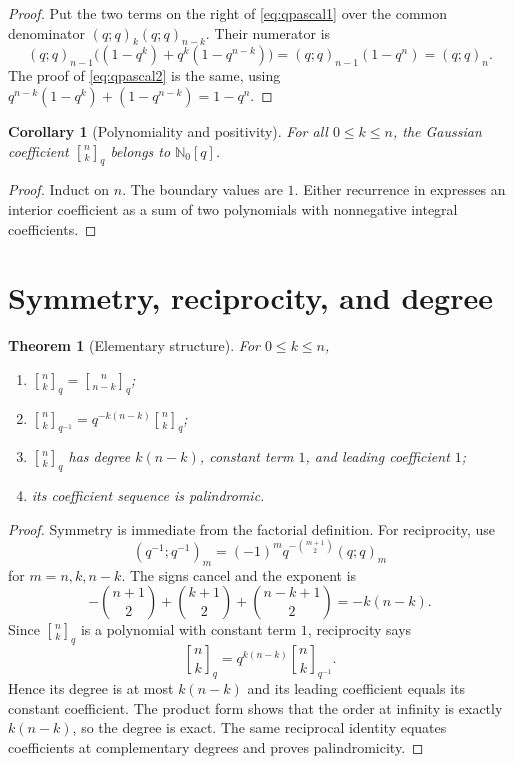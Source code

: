 \documentclass[11pt,oneside,openany]{book}
\newtheorem{theorem}{Theorem}[chapter]
\newtheorem{corollary}[corollary]{Corollary}
\theoremstyle{definition}
\theoremstyle{remark}
\newcommand{\qbinom}[2]{\genfrac{[}{]}{0pt}{}{#1}{#2}_{q}}
\newcommand{\Qbinom}[3]{\genfrac{[}{]}{0pt}{}{#1}{#2}_{#3}}
\newcommand{\N}{\mathbb N}
\begin{document}
\begin{proof}
Put the two terms on the right of \eqref{eq:qpascal1} over the common denominator $(q;q)_k(q;q)_{n-k}$.  Their numerator is
\[
 (q;q)_{n-1}\bigl((1-q^k)+q^k(1-q^{n-k})\bigr)
 =(q;q)_{n-1}(1-q^n)=(q;q)_n.
\]
The proof of \eqref{eq:qpascal2} is the same, using
\(
 q^{n-k}(1-q^k)+(1-q^{n-k})=1-q^n.
\)
\end{proof}

\begin{corollary}[Polynomiality and positivity]\label{cor:positivity}
For all $0\le k\le n$, the Gaussian coefficient $\qbinom nk$ belongs to $\N_0[q]$.
\end{corollary}

\begin{proof}
Induct on $n$.  The boundary values are $1$.  Either recurrence in  expresses an interior coefficient as a sum of two polynomials with nonnegative integral coefficients.
\end{proof}

\section{Symmetry, reciprocity, and degree}

\begin{theorem}[Elementary structure]\label{thm:qbinom-structure}
For $0\le k\le n$,
\begin{enumerate}[label=\textup{(\roman*)}]
\item $\qbinom nk=\qbinom n{n-k}$;
\item $\displaystyle \Qbinom nk{q^{-1}}=q^{-k(n-k)}\qbinom nk$;
\item $\qbinom nk$ has degree $k(n-k)$, constant term $1$, and leading coefficient $1$;
\item its coefficient sequence is palindromic.
\end{enumerate}
\end{theorem}

\begin{proof}
Symmetry is immediate from the factorial definition.  For reciprocity, use
\[
 (q^{-1};q^{-1})_m=(-1)^mq^{-\binom{m+1}{2}}(q;q)_m
\]
for $m=n,k,n-k$.  The signs cancel and the exponent is
\[
 -\binom{n+1}{2}+\binom{k+1}{2}+\binom{n-k+1}{2}=-k(n-k).
\]
Since $\qbinom nk$ is a polynomial with constant term $1$, reciprocity says
\[
 \qbinom nk=q^{k(n-k)}\Qbinom nk{q^{-1}}.
\]
Hence its degree is at most $k(n-k)$ and its leading coefficient equals its constant coefficient.  The product form shows that the order at infinity is exactly $k(n-k)$, so the degree is exact.  The same reciprocal identity equates coefficients at complementary degrees and proves palindromicity.
\end{proof}
\end{document}
